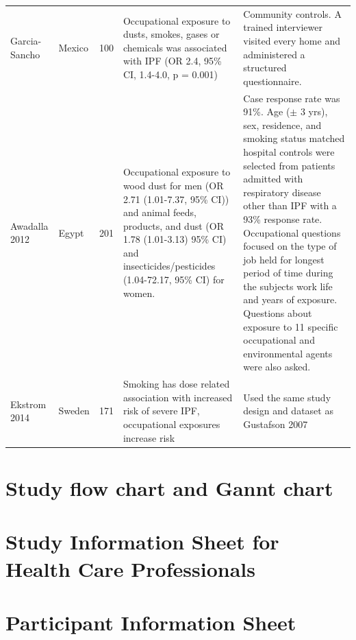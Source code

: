 \documentclass[a4paper,10pt]{article}
\begin{document}
\begin{appendices}
\begin{table}[htbp]
\begin{tabular}{p{1.3cm}p{0.8cm}p{0.8cm}p{6cm}p{5cm}}
Garcia-Sancho & Mexico & 100 & Occupational exposure to dusts, smokes, gases or chemicals was associated with IPF (OR 2.4, 95\% CI, 1.4-4.0, p = 0.001) & Community controls. A trained interviewer visited every home and administered a structured questionnaire. \\


Awadalla 2012 & Egypt & 201 & Occupational exposure to wood dust for men (OR 2.71 (1.01-7.37, 95\% CI)) and animal feeds, products, and dust (OR 1.78 (1.01-3.13) 95\% CI) and insecticides/pesticides (1.04-72.17, 95\% CI) for women. & Case response rate was 91\%. Age (\ensuremath{\pm} 3 yrs), sex, residence, and smoking status matched hospital controls were selected from patients admitted with respiratory disease other than IPF with a 93\% response rate. Occupational questions focused on the type of job held for longest period of time during the subjects work life and years of exposure. Questions about exposure to 11 specific occupational and environmental agents were also asked. \\

Ekstrom 2014 & Sweden & 171 & Smoking has dose related association with increased risk of severe IPF, occupational exposures increase risk & Used the same study design and dataset as Gustafson 2007 \\


\bottomrule
\end{tabular}
\end{table}

\clearpage 

\section{Study flow chart and Gannt chart}




\section{Study Information Sheet for Health Care Professionals}

 \newpage

\section{Participant Information Sheet}
	


\end{appendices}
\end{document}
